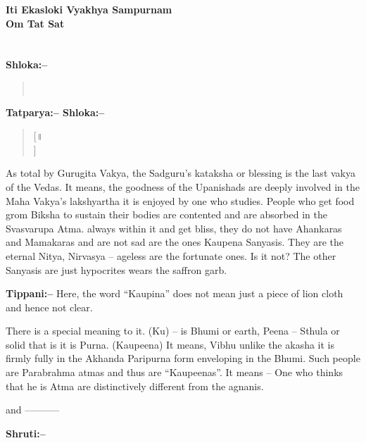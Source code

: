 \begin{center}
\textbf{Iti Ekasloki Vyakhya Sampurnam\\ Om Tat Sat}
\end{center}

\chapter{}

\textbf{Shloka:–}

\begin{verse}
 \\ 
\end{verse}

\textbf{Tatparya:– Shloka:–}

\begin{verse}
 [॥ \\]
\end{verse}

As total by Gurugita Vakya, the Sadguru's kataksha or blessing is the last vakya of the Vedas. It means, the goodness of the Upanishads are deeply involved in the Maha Vakya's lakshyartha it is enjoyed by one who studies. People who get food grom Biksha to sustain their bodies are contented and are absorbed in the Svasvarupa Atma. always within it and get bliss, they do not have Ahankaras and Mamakaras and are not sad are the ones Kaupena Sanyasis. They are the eternal Nitya, Nirvasya – ageless are the fortunate ones. Is it not? The other Sanyasis are just hypocrites wears the saffron garb.

\textbf{Tippani:–} Here, the word “Kaupina” does not mean just a piece of lion cloth and hence not clear.

There is a special meaning to it. (Ku) – is Bhumi or earth, Peena – Sthula or solid that is it is Purna. (Kaupeena) It means, Vibhu unlike the akasha it is firmly fully in the Akhanda Paripurna form enveloping in the Bhumi. Such people are Parabrahma atmas and thus are “Kaupeenas”. It means – One who thinks that he is Atma are distinctively different from the agnanis.

and –––––––

\textbf{Shruti:–}

